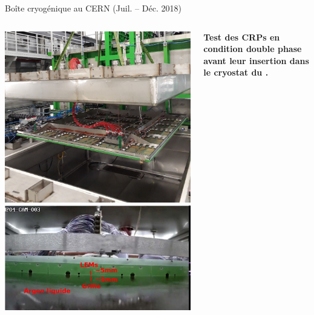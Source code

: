     \begin{frame}{Boîte cryogénique au CERN (Juil. -- Déc. 2018)}
   		\begin{columns}
   			\begin{column}{0.4\textwidth}
   				\includegraphics[width=1.05\textwidth]{./pictures/crp_inserting_coldbox.png}\\
   				\includegraphics[width=1.05\textwidth]{./pictures/in_coldbox.png}\\
    		\end{column}
    		\begin{column}{0.6\textwidth}
    			\begin{scriptsize}
	    			\textbf{Test des CRPs en condition double phase avant leur insertion dans le cryostat du \SSS{}.}\\
	    			

\end{scriptsize}
\end{column}
\end{columns}
\end{frame}
